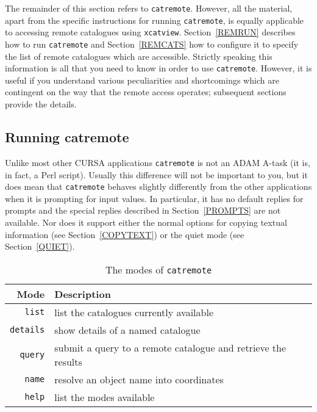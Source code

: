 \documentclass[twoside,11pt]{article}
\renewcommand{\_}{\texttt{\symbol{95}}}
\begin{document}
The remainder of this section refers to {\tt catremote}.  However, all
the material, apart from the specific instructions for running
{\tt catremote}, is equally applicable to accessing remote catalogues
using {\tt xcatview}.  Section~\ref{REMRUN} describes how to run
{\tt catremote} and Section~\ref{REMCATS} how to configure it to specify
the list of remote catalogues which are accessible.  Strictly speaking this
information is all that you need to know in order to use {\tt catremote}.
However, it is useful if you understand various peculiarities and
shortcomings which are contingent on the way that the remote access
operates; subsequent sections provide the details.

\subsection{Running catremote \label{REMRUN}}

Unlike most other CURSA applications {\tt catremote} is not an ADAM
A-task (it is, in fact, a Perl script).  Usually this difference will
not be important to you, but it does mean that {\tt catremote} behaves
slightly differently from the other applications when it is prompting for
input values.  In particular, it has no default replies for prompts and
the special replies described in Section~\ref{PROMPTS} are not available.
Nor does it support either the normal options for copying textual
information (see Section~\ref{COPYTEXT}) or the quiet mode (see
Section~\ref{QUIET}).

\begin{table}[htbp]

\begin{center}
\begin{tabular}{rl}
Mode          &  Description \\ \hline
{\tt list}    & list the catalogues currently available \\
{\tt details} & show details of a named catalogue \\
{\tt query}   & submit a query to a remote catalogue and retrieve the results \\
{\tt name}    & resolve an object name into coordinates \\
{\tt help}    & list the modes available \\
\end{tabular}
\end{center}

\caption{The modes of {\tt catremote}
\label{MODES} }

\end{table}
\end{document}
